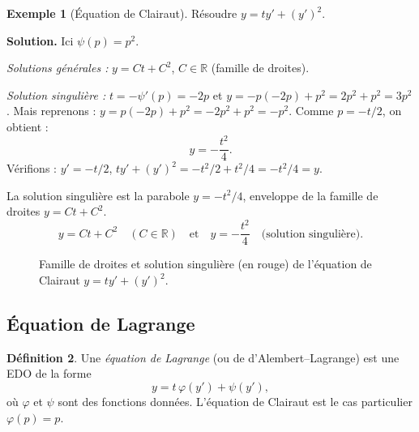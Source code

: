 \documentclass[12pt,a4paper,openany]{book}
\theoremstyle{definition}
\newtheorem{definition}{Définition}[chapter]
\newtheorem{exemple}[definition]{Exemple}
\theoremstyle{plain}
\theoremstyle{remark}
\newcommand{\R}{\mathbb{R}}
\newcommand{\C}{\mathbb{C}}
\begin{document}
\begin{exemple}[Équation de Clairaut]
\label{ex:clairaut}
Résoudre $y = ty' + (y')^2$.

\textbf{Solution.} Ici $\psi(p) = p^2$.

\textit{Solutions générales :} $y = Ct + C^2$, $C \in \R$ (famille de droites).

\textit{Solution singulière :} $t = -\psi'(p) = -2p$ et $y = -p(-2p) + p^2 = 2p^2 + p^2 = 3p^2$. Mais reprenons : $y = p(-2p) + p^2 = -2p^2 + p^2 = -p^2$. Comme $p = -t/2$, on obtient :
\[
y = -\frac{t^2}{4}.
\]
Vérifions : $y' = -t/2$, $ty' + (y')^2 = -t^2/2 + t^2/4 = -t^2/4 = y$.

La solution singulière est la parabole $y = -t^2/4$, enveloppe de la famille de droites $y = Ct + C^2$.
\[
\boxed{y = Ct + C^2 \quad (C \in \R) \quad \text{et} \quad y = -\frac{t^2}{4} \quad \text{(solution singulière).}}
\]
\end{exemple}

\begin{figure}[ht]
\centering
{}
\caption{Famille de droites et solution singulière (en rouge) de l'équation de Clairaut $y = ty' + (y')^2$.}
\label{fig:clairaut}
\end{figure}

\subsection{Équation de Lagrange}
\label{subsec:lagrange}

\begin{definition}
\label{def:lagrange}
Une \emph{équation de Lagrange} (ou de d'Alembert--Lagrange) est une EDO de la forme
\begin{equation}
\label{eq:lagrange}
y = t\,\varphi(y') + \psi(y'),
\end{equation}
où $\varphi$ et $\psi$ sont des fonctions données. L'équation de Clairaut est le cas particulier $\varphi(p) = p$.
\end{definition}
\end{document}

